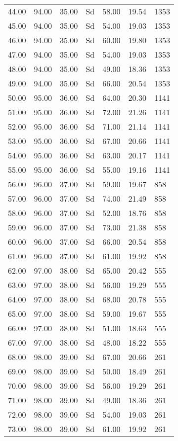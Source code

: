 \begin{center}
\begin{longtable}{|p{0.5in}|p{0.5in}|p{0.5in}|p{0.5in}|p{0.6in}|p{0.6in}|p{0.6in}|}
 44.00 & 94.00 & 35.00 & Sd & 58.00 & 19.54 & 1353 \\ 
 45.00 & 94.00 & 35.00 & Sd & 54.00 & 19.03 & 1353 \\ 
 46.00 & 94.00 & 35.00 & Sd & 60.00 & 19.80 & 1353 \\ 
 47.00 & 94.00 & 35.00 & Sd & 54.00 & 19.03 & 1353 \\ 
 48.00 & 94.00 & 35.00 & Sd & 49.00 & 18.36 & 1353 \\ 
 49.00 & 94.00 & 35.00 & Sd & 66.00 & 20.54 & 1353 \\
 50.00 & 95.00 & 36.00 & Sd & 64.00 & 20.30 & 1141 \\ 
 51.00 & 95.00 & 36.00 & Sd & 72.00 & 21.26 & 1141 \\ 
 52.00 & 95.00 & 36.00 & Sd & 71.00 & 21.14 & 1141 \\ 
 53.00 & 95.00 & 36.00 & Sd & 67.00 & 20.66 & 1141 \\ 
 54.00 & 95.00 & 36.00 & Sd & 63.00 & 20.17 & 1141 \\ 
 55.00 & 95.00 & 36.00 & Sd & 55.00 & 19.16 & 1141 \\ 
 56.00 & 96.00 & 37.00 & Sd & 59.00 & 19.67 & 858 \\ 
 57.00 & 96.00 & 37.00 & Sd & 74.00 & 21.49 & 858 \\ 
 58.00 & 96.00 & 37.00 & Sd & 52.00 & 18.76 & 858 \\ 
 59.00 & 96.00 & 37.00 & Sd & 73.00 & 21.38 & 858 \\ 
 60.00 & 96.00 & 37.00 & Sd & 66.00 & 20.54 & 858 \\ 
 61.00 & 96.00 & 37.00 & Sd & 61.00 & 19.92 & 858 \\
 62.00 & 97.00 & 38.00 & Sd & 65.00 & 20.42 & 555 \\ 
 63.00 & 97.00 & 38.00 & Sd & 56.00 & 19.29 & 555 \\ 
 64.00 & 97.00 & 38.00 & Sd & 68.00 & 20.78 & 555 \\ 
 65.00 & 97.00 & 38.00 & Sd & 59.00 & 19.67 & 555 \\ 
 66.00 & 97.00 & 38.00 & Sd & 51.00 & 18.63 & 555 \\ 
 67.00 & 97.00 & 38.00 & Sd & 48.00 & 18.22 & 555 \\ 
 68.00 & 98.00 & 39.00 & Sd & 67.00 & 20.66 & 261 \\ 
 69.00 & 98.00 & 39.00 & Sd & 50.00 & 18.49 & 261 \\ 
 70.00 & 98.00 & 39.00 & Sd & 56.00 & 19.29 & 261 \\ 
 71.00 & 98.00 & 39.00 & Sd & 49.00 & 18.36 & 261 \\ 
 72.00 & 98.00 & 39.00 & Sd & 54.00 & 19.03 & 261 \\ 
 73.00 & 98.00 & 39.00 & Sd & 61.00 & 19.92 & 261 \\ 
   \hline
\end{longtable}
\end{center}
%
